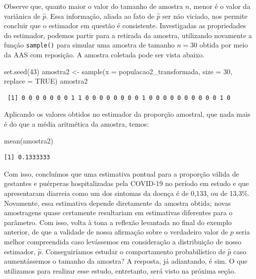 \documentclass[
  letterpaper,
  DIV=11,
  numbers=noendperiod]{scrreprt}
\newenvironment{Shaded}{\begin{snugshade}}{\end{snugshade}}
\newcommand{\AttributeTok}[1]{\textcolor[rgb]{0.40,0.45,0.13}{#1}}
\newcommand{\ConstantTok}[1]{\textcolor[rgb]{0.56,0.35,0.01}{#1}}
\newcommand{\DecValTok}[1]{\textcolor[rgb]{0.68,0.00,0.00}{#1}}
\newcommand{\FunctionTok}[1]{\textcolor[rgb]{0.28,0.35,0.67}{#1}}
\newcommand{\NormalTok}[1]{\textcolor[rgb]{0.00,0.23,0.31}{#1}}
\newcommand{\OtherTok}[1]{\textcolor[rgb]{0.00,0.23,0.31}{#1}}
\begin{document}
Observe que, quanto maior o valor do tamanho de amostra \(n\), menor é o
valor da variânica de \(\hat{p}\). Essa informação, aliada ao fato de
\(\hat{p}\) ser não viciado, nos permite concluir que o estimador em
questão é consistente. Investigadas as propriedades do estimador,
podemos partir para a retirada da amostra, utilizando novamente a função
\texttt{sample()} para simular uma amostra de tamanho \(n = 30\) obtida
por meio da AAS com reposição. A amostra coletada pode ser vista abaixo.

\begin{Shaded}
\begin{Highlighting}[]
\FunctionTok{set.seed}\NormalTok{(}\DecValTok{43}\NormalTok{)}
\NormalTok{amostra2 }\OtherTok{\textless{}{-}} \FunctionTok{sample}\NormalTok{(}\AttributeTok{x =}\NormalTok{ populacao2\_transformada, }\AttributeTok{size =} \DecValTok{30}\NormalTok{, }\AttributeTok{replace =} \ConstantTok{TRUE}\NormalTok{)}
\NormalTok{amostra2}
\end{Highlighting}
\end{Shaded}

\begin{verbatim}
 [1] 0 0 0 0 0 0 0 1 1 0 0 0 0 0 0 0 0 1 0 0 0 0 0 0 0 0 0 0 1 0
\end{verbatim}

Aplicando os valores obtidos no estimador da proporção amostral, que
nada mais é do que a média aritmética da amostra, temos:

\begin{Shaded}
\begin{Highlighting}[]
\FunctionTok{mean}\NormalTok{(amostra2)}
\end{Highlighting}
\end{Shaded}

\begin{verbatim}
[1] 0.1333333
\end{verbatim}

Com isso, concluímos que uma estimativa pontual para a proporção válida
de gestantes e puérperas hospitalizadas pela COVID-19 no período em
estudo e que apresentaram diarreia como um dos sintomas da doença é de
0,133, ou de 13,3\%. Novamente, essa estimativa depende diretamente da
amostra obtida; novas amostragens quase certamente resultariam em
estimativas diferentes para o parâmetro. Com isso, volta à tona a
reflexão levantada no final do exemplo anterior, de que a validade de
nossa afirmação sobre o verdadeiro valor de \(p\) seria melhor
compreendida caso levássemos em consideração a distribuição de nosso
estimador, \(\hat{p}\). Conseguiríamos estudar o comportamento
probabilístico de \(\hat{p}\) caso aumentássemos o tamanho da amostra? A
resposta, já adiantando, é sim. O que utilizamos para realizar esse
estudo, entretanto, será visto na próxima seção.
\end{document}
